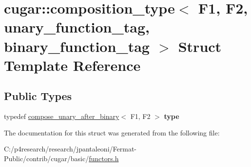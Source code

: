 \hypertarget{structcugar_1_1composition__type_3_01_f1_00_01_f2_00_01unary__function__tag_00_01binary__function__tag_01_4}{}\section{cugar\+:\+:composition\+\_\+type$<$ F1, F2, unary\+\_\+function\+\_\+tag, binary\+\_\+function\+\_\+tag $>$ Struct Template Reference}
\label{structcugar_1_1composition__type_3_01_f1_00_01_f2_00_01unary__function__tag_00_01binary__function__tag_01_4}
\subsection*{Public Types}
\begin{DoxyCompactItemize}
\item 
\mbox{\label{structcugar_1_1composition__type_3_01_f1_00_01_f2_00_01unary__function__tag_00_01binary__function__tag_01_4_a956e15fef86ee948642e7bb018c88be1}} 
typedef \hyperlink{structcugar_1_1compose__unary__after__binary}{compose\+\_\+unary\+\_\+after\+\_\+binary}$<$ F1, F2 $>$ {\bfseries type}
\end{DoxyCompactItemize}


The documentation for this struct was generated from the following file\+:\begin{DoxyCompactItemize}
\item 
C\+:/p4research/research/jpantaleoni/\+Fermat-\/\+Public/contrib/cugar/basic/\hyperlink{functors_8h}{functors.\+h}\end{DoxyCompactItemize}
